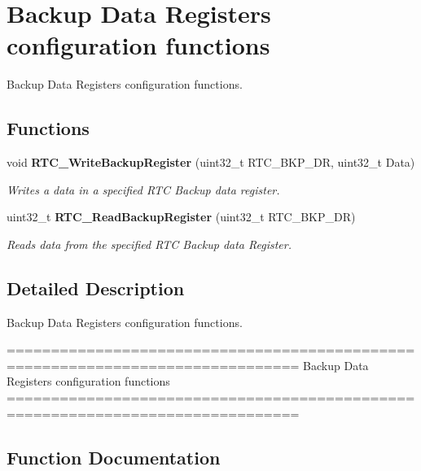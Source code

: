 \section{Backup Data Registers configuration functions}
\label{group__RTC__Group10}


Backup Data Registers configuration functions.  


\subsection*{Functions}
\begin{DoxyCompactItemize}
\item 
void \textbf{ R\+T\+C\+\_\+\+Write\+Backup\+Register} (uint32\+\_\+t R\+T\+C\+\_\+\+B\+K\+P\+\_\+\+DR, uint32\+\_\+t Data)
\begin{DoxyCompactList}\small\item\em Writes a data in a specified R\+TC Backup data register. \end{DoxyCompactList}\item 
uint32\+\_\+t \textbf{ R\+T\+C\+\_\+\+Read\+Backup\+Register} (uint32\+\_\+t R\+T\+C\+\_\+\+B\+K\+P\+\_\+\+DR)
\begin{DoxyCompactList}\small\item\em Reads data from the specified R\+TC Backup data Register. \end{DoxyCompactList}\end{DoxyCompactItemize}


\subsection{Detailed Description}
Backup Data Registers configuration functions. 

\begin{DoxyVerb} ===============================================================================
                       Backup Data Registers configuration functions 
 ===============================================================================  \end{DoxyVerb}
 

\subsection{Function Documentation}
\mbox{\label{group__RTC__Group10_ga504489fd91a66e392beb82bb8230b37f}} 
